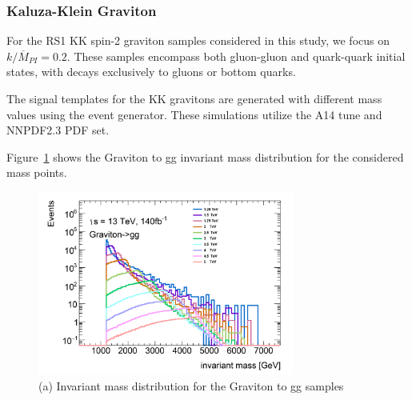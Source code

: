 %
%
%
%

\subsubsection{Kaluza-Klein Graviton}
\label{sec:kkgraviton}

For the RS1 KK spin-2 graviton samples considered in this study, we focus on $k/\overline{M}_{PI} = 0.2$. These samples encompass both gluon-gluon and quark-quark initial states, with decays exclusively to gluons or bottom quarks.

The signal templates for the KK gravitons are generated with different mass values using the  event generator. These simulations utilize the A14 tune and NNPDF2.3 PDF set.

Figure~\ref{fig:Ggg} shows the Graviton to gg invariant mass distribution for the considered mass points.

\begin{figure}[!h]
	\centering
\includegraphics[width=0.75\textwidth]{fig/benchmark_signals/Ggg_mjj.pdf}
	\caption{(a) Invariant mass distribution for the Graviton to gg samples
		\label{fig:Ggg}
	}
\end{figure}

